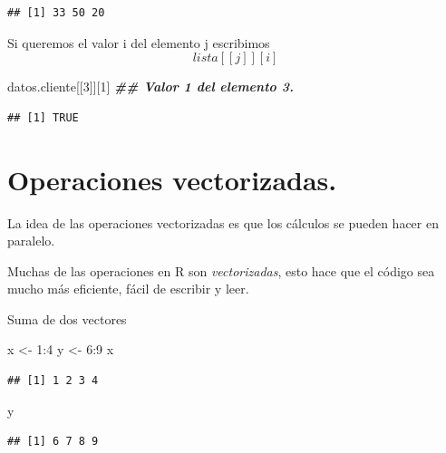 \documentclass[
  12pt,
]{book}
\newenvironment{Shaded}{\begin{snugshade}}{\end{snugshade}}
\newcommand{\DecValTok}[1]{\textcolor[rgb]{0.00,0.00,0.81}{#1}}
\newcommand{\DocumentationTok}[1]{\textcolor[rgb]{0.56,0.35,0.01}{\textbf{\textit{#1}}}}
\newcommand{\NormalTok}[1]{#1}
\newcommand{\OtherTok}[1]{\textcolor[rgb]{0.56,0.35,0.01}{#1}}
\newcommand{\SpecialCharTok}[1]{\textcolor[rgb]{0.00,0.00,0.00}{#1}}
\begin{document}
\begin{verbatim}
## [1] 33 50 20
\end{verbatim}

Si queremos el valor i del elemento j escribimos \[lista[[j]][i]\]

\begin{Shaded}
\begin{Highlighting}[]
\NormalTok{datos.cliente[[}\DecValTok{3}\NormalTok{]][}\DecValTok{1}\NormalTok{] }\DocumentationTok{\#\# Valor 1 del elemento 3.}
\end{Highlighting}
\end{Shaded}

\begin{verbatim}
## [1] TRUE
\end{verbatim}

\hypertarget{operaciones-vectorizadas.}{%
\chapter{\texorpdfstring{\textbf{Operaciones vectorizadas.}}{Operaciones vectorizadas.}}\label{operaciones-vectorizadas.}}

La idea de las operaciones vectorizadas es que los cálculos se pueden hacer en paralelo.

Muchas de las operaciones en R son \emph{vectorizadas}, esto hace que el código sea mucho más eficiente, fácil de escribir y leer.

Suma de dos vectores

\begin{Shaded}
\begin{Highlighting}[]
\NormalTok{x }\OtherTok{\textless{}{-}} \DecValTok{1}\SpecialCharTok{:}\DecValTok{4}
\NormalTok{y }\OtherTok{\textless{}{-}} \DecValTok{6}\SpecialCharTok{:}\DecValTok{9}
\NormalTok{x}
\end{Highlighting}
\end{Shaded}

\begin{verbatim}
## [1] 1 2 3 4
\end{verbatim}

\begin{Shaded}
\begin{Highlighting}[]
\NormalTok{y}
\end{Highlighting}
\end{Shaded}

\begin{verbatim}
## [1] 6 7 8 9
\end{verbatim}
\end{document}
